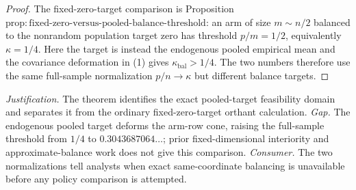 \documentclass{article}
\begin{document}
\begin{proof}
The fixed-zero-target comparison is Proposition \(\mathrm{prop{:}fixed\mbox{-}zero\mbox{-}versus\mbox{-}pooled\mbox{-}balance\mbox{-}threshold}\): an arm of size \(m\sim n/2\) balanced to the nonrandom population target zero has threshold \(p/m=1/2\), equivalently \(\kappa=1/4\).  Here the target is instead the endogenous pooled empirical mean and the covariance deformation in (1) gives \(\kappa_{\mathrm{bal}}>1/4\).  The two numbers therefore use the same full-sample normalization \(p/n\to\kappa\) but different balance targets.
\end{proof}
\par\smallskip\noindent \textit{Justification.} The theorem identifies the exact pooled-target feasibility domain and separates it from the ordinary fixed-zero-target orthant calculation. \textit{Gap.} The endogenous pooled target deforms the arm-row cone, raising the full-sample threshold from \(1/4\) to \(0.3043687064\ldots\); prior fixed-dimensional interiority and approximate-balance work does not give this comparison. \textit{Consumer.} The two normalizations tell analysts when exact same-coordinate balancing is unavailable before any policy comparison is attempted.
\end{document}
